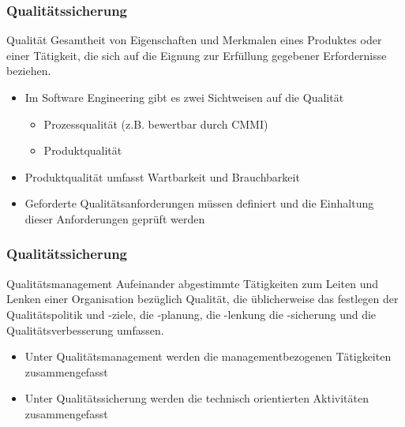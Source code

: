 \begin{frame}
\frametitle{Qualitätssicherung}
	\begin{block}{Qualität}
		Gesamtheit von Eigenschaften und Merkmalen eines Produktes oder einer Tätigkeit,
		die sich auf die Eignung zur Erfüllung gegebener Erfordernisse beziehen.
	\end{block}
	\begin{itemize}
		\item Im Software Engineering gibt es zwei Sichtweisen auf die Qualität
		\begin{itemize}
			\item Prozessqualität (z.B. bewertbar durch CMMI)
			\item Produktqualität
		\end{itemize}
		\item Produktqualität umfasst Wartbarkeit und Brauchbarkeit
		\item Geforderte Qualitätsanforderungen müssen definiert und die Einhaltung
					dieser Anforderungen geprüft werden
	\end{itemize}
\end{frame}

\begin{frame}
\frametitle{Qualitätssicherung}
	\begin{block}{Qualitätsmanagement}
		Aufeinander abgestimmte Tätigkeiten zum Leiten und Lenken einer Organisation
		bezüglich Qualität, die üblicherweise das festlegen der Qualitätspolitik und
		-ziele, die -planung, die -lenkung die -sicherung und die Qualitätsverbesserung
		umfassen.
	\end{block}
	\begin{itemize}
		\item Unter Qualitätsmanagement werden die managementbezogenen Tätigkeiten zusammengefasst
		\item Unter Qualitätssicherung werden die technisch orientierten Aktivitäten zusammengefasst
	\end{itemize}
\end{frame}

